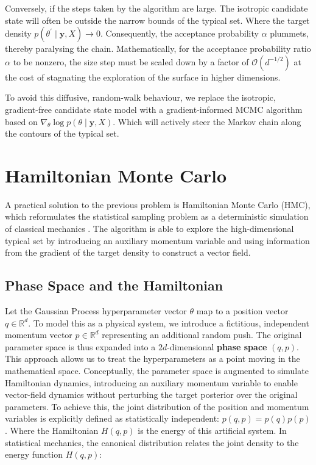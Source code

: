 \documentclass[12pt,oneside]{report}
\theoremstyle{definition}
\theoremstyle{remark}
\begin{document}
Conversely, if the steps taken by the algorithm are large. The isotropic candidate state will often be outside the narrow bounds of the typical set. Where the target density $p(\theta^\prime \mid \mathbf{y}, X) \to 0$. Consequently, the acceptance probability $\alpha$ plummets, thereby paralysing the chain. Mathematically, for the acceptance probability ratio $\alpha$ to be nonzero, the size step must be scaled down by a factor of $\mathcal{O}(d^{-1/2})$ at the cost of stagnating the exploration of the surface in higher dimensions.

To avoid this diffusive, random-walk behaviour, we replace the isotropic, gradient-free candidate state model with a gradient-informed MCMC algorithm based on $\nabla_\theta \log p(\theta \mid \mathbf{y}, X)$. Which will actively steer the Markov chain along the contours of the typical set.

\section{Hamiltonian Monte Carlo}
A practical solution to the previous problem is Hamiltonian Monte Carlo (HMC), which reformulates the statistical sampling problem as a deterministic simulation of classical mechanics \cite{neal2011mcmc}. The algorithm is able to explore the high-dimensional typical set by introducing an auxiliary momentum variable and using information from the gradient of the target density to construct a vector field.

\subsection{Phase Space and the Hamiltonian}

Let the Gaussian Process hyperparameter vector $\theta$ map to a position vector $q \in \mathbb{R}^d$. To model this as a physical system, we introduce a fictitious, independent momentum vector $p \in \mathbb{R}^d$ representing an additional random push. The original parameter space is thus expanded into a $2d$-dimensional \textbf{phase space} $(q, p)$. This approach allows us to treat the hyperparameters as a point moving in the mathematical space. Conceptually, the parameter space is augmented to simulate Hamiltonian dynamics, introducing an auxiliary momentum variable to enable vector-field dynamics without perturbing the target posterior over the original parameters. To achieve this, the joint distribution of the position and momentum variables is explicitly defined as statistically independent: $p(q, p) = p(q)p(p)$. Where the Hamiltonian $H(q, p)$ is the energy of this artificial system. In statistical mechanics, the canonical distribution relates the joint density to the energy function $H(q, p)$:
\end{document}

